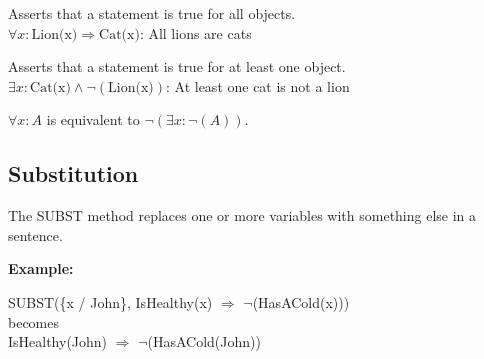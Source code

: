 \documentclass[
../EiKI_Summary.tex,
]
{subfiles}
\begin{document}
\begin{minipage}
    [t]{0.5\textwidth}
    \begin{defbox}
        Asserts that a statement is true for all objects.\\
        $\forall x: \text{Lion(x)} \Rightarrow \text{Cat(x)}$: All lions are cats
    \end{defbox}
\end{minipage}
\begin{minipage}
    [t]{0.5\textwidth}
    \begin{defbox}
        Asserts that a statement is true for at least one object.\\
        $\exists x: \text{Cat(x)} \land \neg(\text{Lion(x)})$: At least one cat is not a lion
    \end{defbox}
\end{minipage}

$\forall x: A$ is equivalent to $\neg(\exists x: \neg(A))$.

\newpage
\subsection{Substitution}
\begin{defbox}
    The SUBST method replaces one or more variables with something else in a sentence.
\end{defbox}

\textbf{Example:}\\

\begin{center}
	SUBST(\{x / John\}, IsHealthy(x) $\Rightarrow$ $\neg$(HasACold(x)))\\
    becomes\\
    IsHealthy(John) $\Rightarrow$ $\neg$(HasACold(John))
\end{center}
\end{document}
